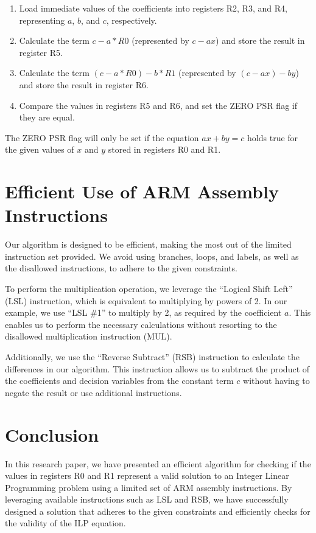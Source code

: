 \begin{enumerate}
    \item Load immediate values of the coefficients into registers R2, R3, and R4, representing $a$, $b$, and $c$, respectively.
    \item Calculate the term $c - a * R0$ (represented by $c - ax$) and store the result in register R5.
    \item Calculate the term $(c - a * R0) - b * R1$ (represented by $(c - ax) - by$) and store the result in register R6.
    \item Compare the values in registers R5 and R6, and set the ZERO PSR flag if they are equal.
\end{enumerate}

The ZERO PSR flag will only be set if the equation $ax + by = c$ holds true for the given values of $x$ and $y$ stored in registers R0 and R1.

\section{Efficient Use of ARM Assembly Instructions}

Our algorithm is designed to be efficient, making the most out of the limited instruction set provided. We avoid using branches, loops, and labels, as well as the disallowed instructions, to adhere to the given constraints.

To perform the multiplication operation, we leverage the “Logical Shift Left” (LSL) instruction, which is equivalent to multiplying by powers of 2. In our example, we use “LSL \#1” to multiply by 2, as required by the coefficient $a$. This enables us to perform the necessary calculations without resorting to the disallowed multiplication instruction (MUL).

Additionally, we use the “Reverse Subtract” (RSB) instruction to calculate the differences in our algorithm. This instruction allows us to subtract the product of the coefficients and decision variables from the constant term $c$ without having to negate the result or use additional instructions.

\section{Conclusion}

In this research paper, we have presented an efficient algorithm for checking if the values in registers R0 and R1 represent a valid solution to an Integer Linear Programming problem using a limited set of ARM assembly instructions. By leveraging available instructions such as LSL and RSB, we have successfully designed a solution that adheres to the given constraints and efficiently checks for the validity of the ILP equation.

